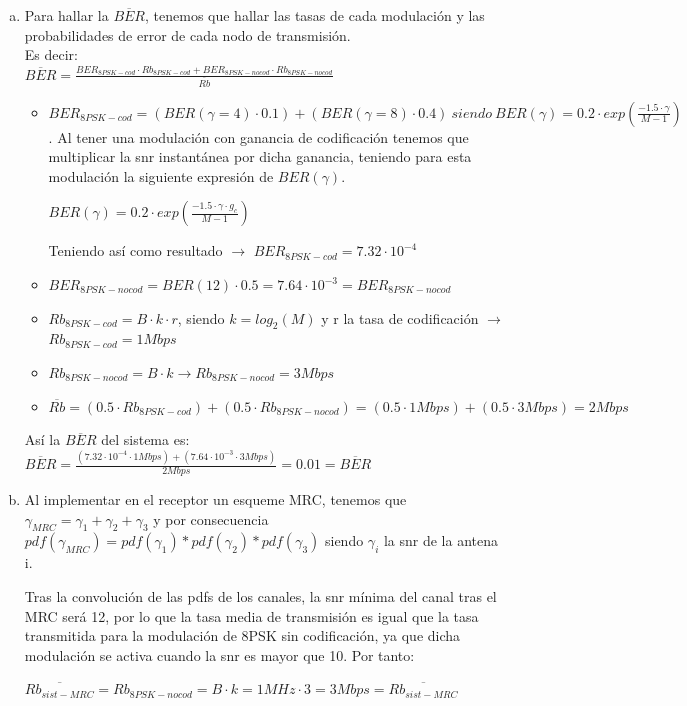 \documentclass[fleqn,14pt]{article}
\begin{document}
\begin{enumerate}[a)]
  \item Para hallar la $\overline{BER}$, tenemos que hallar las tasas de cada modulación y las probabilidades de error de cada nodo de transmisión.\\
  Es decir:\\
  \centering
  $\overline{BER} = \frac{BER_{8PSK-cod} \cdot Rb_{8PSK-cod} + BER_{8PSK-nocod} \cdot Rb_{8PSK-nocod}}{\overline{Rb}}$

  \raggedright
  \begin{itemize}
    \item   $BER_{8PSK-cod} = (BER(\gamma=4)\cdot 0.1) + (BER(\gamma=8)\cdot 0.4)\ siendo\ BER(\gamma) = 0.2 \cdot exp(\frac{-1.5\cdot \gamma}{M - 1})$. Al tener una modulación con ganancia de codificación tenemos que multiplicar la snr instantánea por dicha ganancia, teniendo para esta modulación la siguiente expresión de $BER(\gamma)$.
    \begin{center}
      $BER(\gamma) = 0.2 \cdot exp(\frac{-1.5 \cdot \gamma \cdot g_c }{M - 1})$
    \end{center}
    \raggedright
    Teniendo así como resultado $\rightarrow$ $\boxed{BER_{8PSK-cod} = 7.32\cdot 10^{-4}}$\\
    \item $BER_{8PSK-nocod} = BER(12) \cdot 0.5 = \boxed{7.64\cdot 10^{-3} = BER_{8PSK-nocod}}$\\
    \item $Rb_{8PSK-cod} = B\cdot k \cdot r$, siendo $ k = log_2 (M) $ y r la tasa de codificación $\rightarrow$ $\boxed{Rb_{8PSK-cod} = 1 Mbps}$\\
    \item $Rb_{8PSK-nocod} = B\cdot k \rightarrow \boxed{Rb_{8PSK-nocod} = 3Mbps}$
    \item $\overline{Rb} = (0.5 \cdot Rb_{8PSK-cod}) + (0.5 \cdot Rb_{8PSK-nocod}) = (0.5 \cdot 1 Mbps) + (0.5 \cdot 3 Mbps) = 2Mbps $
  \end{itemize}

  Así la $\overline{BER}$ del sistema es:\\
  \centering
  $\overline{BER} = \frac{(7.32\cdot 10^{-4} \cdot 1 Mbps) + (7.64\cdot 10^{-3} \cdot 3Mbps)}{2 Mbps} = \boxed{0.01 = \overline{BER}}$\\
  \raggedright
  \item Al implementar en el receptor un esqueme MRC, tenemos que $\gamma_{MRC} = \gamma_1 + \gamma_2 + \gamma_3$ y por consecuencia $pdf(\gamma_{MRC}) = pdf(\gamma_1)*pdf(\gamma_2)*pdf(\gamma_3)$ siendo $\gamma_i$ la snr de la antena i.

  Tras la convolución de las pdfs de los canales, la snr mínima del canal tras el MRC será 12, por lo que la tasa media de transmisión es igual que la tasa transmitida para la modulación de 8PSK sin codificación, ya que dicha modulación se activa cuando la snr es mayor que 10. Por tanto:\\
  \begin{center}
    $\overline{Rb_{sist-MRC}} = Rb_{8PSK-nocod} = B \cdot k = 1 MHz \cdot 3 = \boxed{3 Mbps = \overline{Rb_{sist-MRC}}}$
  \end{center}
\end{enumerate}
\end{document}

